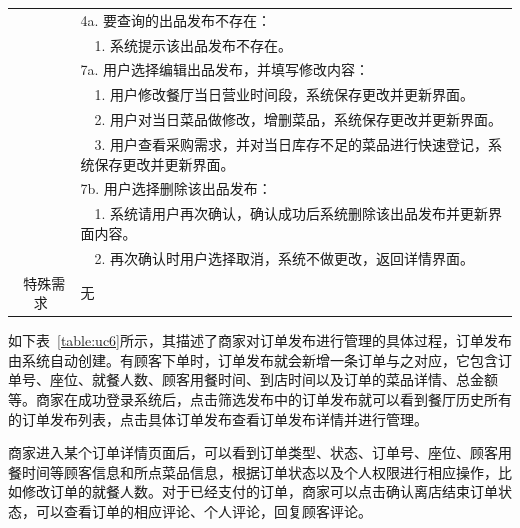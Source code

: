 \begin{table}[htbp!]
\begin{tabular}{cp{11.5cm}}
    & 4a. 要查询的出品发布不存在：\\
    & ~~1.	系统提示该出品发布不存在。\\
    & 7a. 用户选择编辑出品发布，并填写修改内容：\\
    & ~~1.	用户修改餐厅当日营业时间段，系统保存更改并更新界面。\\
    & ~~2.	用户对当日菜品做修改，增删菜品，系统保存更改并更新界面。\\
    & ~~3.	用户查看采购需求，并对当日库存不足的菜品进行快速登记，系统保存更改并更新界面。\\
    & 7b. 用户选择删除该出品发布：\\
    & ~~1.	系统请用户再次确认，确认成功后系统删除该出品发布并更新界面内容。\\
    & ~~2.	再次确认时用户选择取消，系统不做更改，返回详情界面。\\
  \hline
  \ 特殊需求 & 无 \\ 
  \hline
  \end{tabular}
  \label{table:uc5}
\end{table}

如下表~\ref{table:uc6}所示，其描述了商家对订单发布进行管理的具体过程，订单发布由系统自动创建。有顾客下单时，订单发布就会新增一条订单与之对应，它包含订单号、座位、就餐人数、顾客用餐时间、到店时间以及订单的菜品详情、总金额等。商家在成功登录系统后，点击筛选发布中的订单发布就可以看到餐厅历史所有的订单发布列表，点击具体订单发布查看订单发布详情并进行管理。

商家进入某个订单详情页面后，可以看到订单类型、状态、订单号、座位、顾客用餐时间等顾客信息和所点菜品信息，根据订单状态以及个人权限进行相应操作，比如修改订单的就餐人数。对于已经支付的订单，商家可以点击确认离店结束订单状态，可以查看订单的相应评论、个人评论，回复顾客评论。

